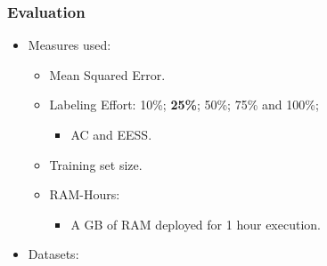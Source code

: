 \documentclass[14pt]{beamer}
\begin{document}
\begin{frame}\frametitle{Evaluation}

\begin{itemize}
\item Measures used:
\begin{itemize}
\item Mean Squared Error.
\item Labeling Effort: 10\%; \textbf{25\%}; 50\%; 75\% and 100\%;
\begin{itemize}
\item AC and EESS.
\end{itemize}
\item Training set size.
\item RAM-Hours:
\begin{itemize}
\item A GB of RAM deployed for 1 hour execution.
\end{itemize}
\end{itemize}
\item Datasets:
\end{itemize}
\begin{table}
\centering
{}
\end{table}
\end{frame}

\end{document}
